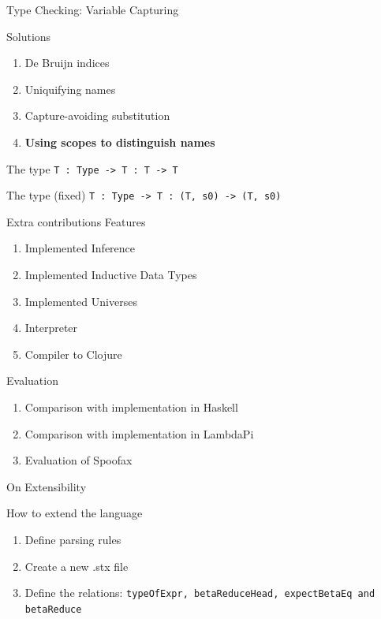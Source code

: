 \documentclass[aspectratio=43]{beamer}
\begin{document}
\begin{frame}[fragile]{Type Checking: Variable Capturing}
	\begin{block}{Solutions}
		\begin{enumerate}
			\item De Bruijn indices
			\item Uniquifying names
			\item Capture-avoiding substitution
			\item \textbf{Using scopes to distinguish names}
		\end{enumerate}
	\end{block}
	
	\begin{block}{The type}
		\texttt{T : Type -> T : T -> T}
	\end{block}
	
	\begin{block}{The type (fixed)}
		\texttt{T : Type -> T : (T, s0) -> (T, s0)}
	\end{block}
\end{frame}



\begin{frame}[fragile]{Extra contributions}
Features
\begin{enumerate}
	\item Implemented Inference
	\item Implemented Inductive Data Types
	\item Implemented Universes
	\item Interpreter
	\item Compiler to Clojure
\end{enumerate}
Evaluation
\begin{enumerate}
	\item Comparison with implementation in Haskell
	\item Comparison with implementation in LambdaPi
	\item Evaluation of Spoofax
\end{enumerate}
\end{frame}

\begin{frame}{On Extensibility}
	\begin{block}{How to extend the language}
		\begin{enumerate}
			\item Define parsing rules
			\item Create a new .stx file
			\item Define the relations: \texttt{typeOfExpr, betaReduceHead, expectBetaEq and betaReduce}
		\end{enumerate}
	\end{block}
\end{frame}
\end{document}
